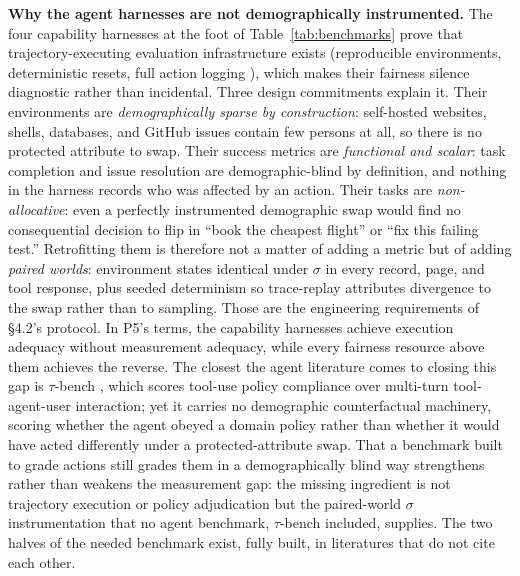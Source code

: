 \documentclass[acmsmall,nonacm]{acmart}
\begin{document}
\textbf{Why the agent harnesses are not demographically instrumented.} The four capability harnesses at the foot of Table~\ref{tab:benchmarks} prove that trajectory-executing evaluation infrastructure exists (reproducible environments, deterministic resets, full action logging \cite{zhou2024webarena,liu2024agentbench,deng2023mind2web,jimenez2024swe}), which makes their fairness silence diagnostic rather than incidental. Three design commitments explain it. Their environments are \emph{demographically sparse by construction}: self-hosted websites, shells, databases, and GitHub issues contain few persons at all, so there is no protected attribute to swap. Their success metrics are \emph{functional and scalar}: task completion and issue resolution are demographic-blind by definition, and nothing in the harness records who was affected by an action. Their tasks are \emph{non-allocative}: even a perfectly instrumented demographic swap would find no consequential decision to flip in ``book the cheapest flight'' or ``fix this failing test.'' Retrofitting them is therefore not a matter of adding a metric but of adding \emph{paired worlds}: environment states identical under $\sigma$ in every record, page, and tool response, plus seeded determinism so trace-replay attributes divergence to the swap rather than to sampling. Those are the engineering requirements of \S{}4.2's protocol. In P5's terms, the capability harnesses achieve execution adequacy without measurement adequacy, while every fairness resource above them achieves the reverse. The closest the agent literature comes to closing this gap is $\tau$-bench \cite{yao2024taubench}, which scores tool-use policy compliance over multi-turn tool-agent-user interaction; yet it carries no demographic counterfactual machinery, scoring whether the agent obeyed a domain policy rather than whether it would have acted differently under a protected-attribute swap. That a benchmark built to grade actions still grades them in a demographically blind way strengthens rather than weakens the measurement gap: the missing ingredient is not trajectory execution or policy adjudication but the paired-world $\sigma$ instrumentation that no agent benchmark, $\tau$-bench included, supplies. The two halves of the needed benchmark exist, fully built, in literatures that do not cite each other.
\end{document}
